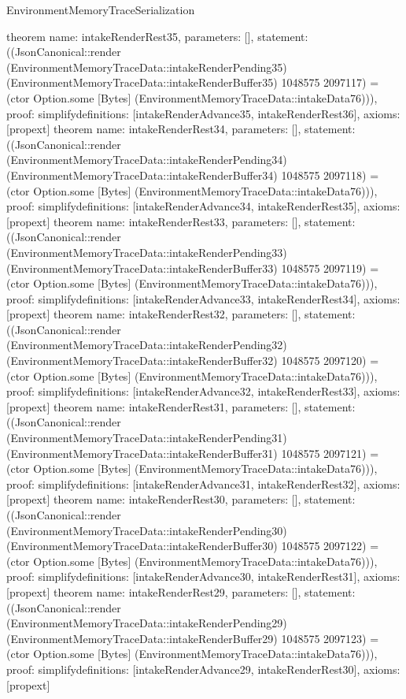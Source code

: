 \begin{lexlean}{EnvironmentMemoryTraceSerialization}
\begin{semanticmodule}
{}
theorem{
 name: intakeRenderRest35, parameters: [],
 statement: ((JsonCanonical::render (EnvironmentMemoryTraceData::intakeRenderPending35) (EnvironmentMemoryTraceData::intakeRenderBuffer35) 1048575 2097117) = (ctor Option.some [Bytes] (EnvironmentMemoryTraceData::intakeData76))), proof: simplify{definitions: [intakeRenderAdvance35, intakeRenderRest36]}, axioms: [propext]
}
theorem{
 name: intakeRenderRest34, parameters: [],
 statement: ((JsonCanonical::render (EnvironmentMemoryTraceData::intakeRenderPending34) (EnvironmentMemoryTraceData::intakeRenderBuffer34) 1048575 2097118) = (ctor Option.some [Bytes] (EnvironmentMemoryTraceData::intakeData76))), proof: simplify{definitions: [intakeRenderAdvance34, intakeRenderRest35]}, axioms: [propext]
}
theorem{
 name: intakeRenderRest33, parameters: [],
 statement: ((JsonCanonical::render (EnvironmentMemoryTraceData::intakeRenderPending33) (EnvironmentMemoryTraceData::intakeRenderBuffer33) 1048575 2097119) = (ctor Option.some [Bytes] (EnvironmentMemoryTraceData::intakeData76))), proof: simplify{definitions: [intakeRenderAdvance33, intakeRenderRest34]}, axioms: [propext]
}
theorem{
 name: intakeRenderRest32, parameters: [],
 statement: ((JsonCanonical::render (EnvironmentMemoryTraceData::intakeRenderPending32) (EnvironmentMemoryTraceData::intakeRenderBuffer32) 1048575 2097120) = (ctor Option.some [Bytes] (EnvironmentMemoryTraceData::intakeData76))), proof: simplify{definitions: [intakeRenderAdvance32, intakeRenderRest33]}, axioms: [propext]
}
theorem{
 name: intakeRenderRest31, parameters: [],
 statement: ((JsonCanonical::render (EnvironmentMemoryTraceData::intakeRenderPending31) (EnvironmentMemoryTraceData::intakeRenderBuffer31) 1048575 2097121) = (ctor Option.some [Bytes] (EnvironmentMemoryTraceData::intakeData76))), proof: simplify{definitions: [intakeRenderAdvance31, intakeRenderRest32]}, axioms: [propext]
}
theorem{
 name: intakeRenderRest30, parameters: [],
 statement: ((JsonCanonical::render (EnvironmentMemoryTraceData::intakeRenderPending30) (EnvironmentMemoryTraceData::intakeRenderBuffer30) 1048575 2097122) = (ctor Option.some [Bytes] (EnvironmentMemoryTraceData::intakeData76))), proof: simplify{definitions: [intakeRenderAdvance30, intakeRenderRest31]}, axioms: [propext]
}
theorem{
 name: intakeRenderRest29, parameters: [],
 statement: ((JsonCanonical::render (EnvironmentMemoryTraceData::intakeRenderPending29) (EnvironmentMemoryTraceData::intakeRenderBuffer29) 1048575 2097123) = (ctor Option.some [Bytes] (EnvironmentMemoryTraceData::intakeData76))), proof: simplify{definitions: [intakeRenderAdvance29, intakeRenderRest30]}, axioms: [propext]
}
\end{semanticmodule}
\end{lexlean}
